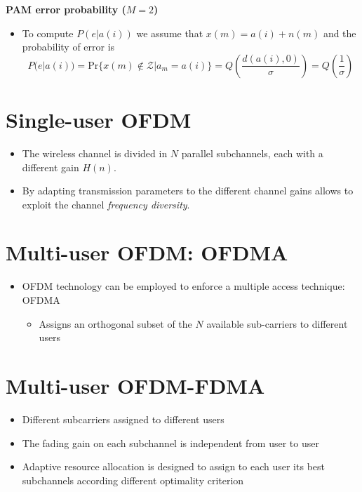 \textbf{PAM error probability (\( M = 2 \))}
\begin{itemize}
    \item To compute \( P(e|a(i)) \) we assume that \( x(m) = a(i) + n(m) \) and the probability of error is
    \[ P(e|a(i)) = \text{Pr}\{x(m) \notin \mathcal{Z}|a_m = a(i)\} = Q\left(\frac{d(a(i), 0)}{\sigma}\right) = Q\left(\frac{1}{\sigma}\right) \]
\end{itemize}


\section*{Single-user OFDM}

\begin{itemize}
    \item The wireless channel is divided in \( N \) parallel subchannels, each with a different gain \( H(n) \).
    \item By adapting transmission parameters to the different channel gains allows to exploit the channel \textit{frequency diversity}.
\end{itemize}

\section*{Multi-user OFDM: OFDMA}

\begin{itemize}
    \item OFDM technology can be employed to enforce a multiple access technique: OFDMA
    \begin{itemize}
        \item Assigns an orthogonal subset of the \( N \) available sub-carriers to different users
    \end{itemize}
\end{itemize}


\section*{Multi-user OFDM-FDMA}

\begin{itemize}
    \item Different subcarriers assigned to different users
    \item The fading gain on each subchannel is independent from user to user
    \item Adaptive resource allocation is designed to assign to each user its best subchannels according different optimality criterion
\end{itemize}

